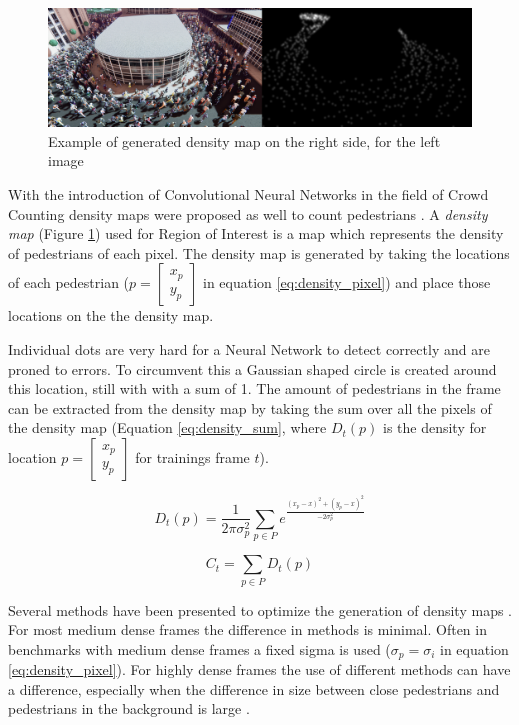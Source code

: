 \begin{figure}[h]
\centering
\includegraphics[width=1.0\textwidth]{images/example_count_map}
\caption{Example of generated density map on the right side, for the left image}
\label{fig:density_map}
\end{figure}

With the introduction of Convolutional Neural Networks in the field of Crowd Counting density maps were proposed as well to count pedestrians \cite{Zhang2016, Liu2019, li2018csrnet}. A \emph{density map} (Figure \ref{fig:density_map}) used for Region of Interest is a map which represents the density of pedestrians of each pixel. The density map is generated by taking the locations of each pedestrian ($p=\begin{bmatrix} x_p \\ y_p \end{bmatrix}$ in equation \ref{eq:density_pixel}) and place those locations on the the density map.

Individual dots are very hard for a Neural Network to detect correctly and are proned to errors. To circumvent this a Gaussian shaped circle is created around this location, still with with a sum of 1. The amount of pedestrians in the frame can be extracted from the density map by taking the sum over all the pixels of the density map (Equation \ref{eq:density_sum}, where $D_t(p)$ is the density for location $p=\begin{bmatrix} x_p \\ y_p \end{bmatrix}$ for trainings frame $t$).

\begin{equation}
\label{eq:density_pixel}
	D_t(p) = \frac{1}{2 \pi \sigma_p^2}\sum_{p\in P} e^{\frac{(x_p-x)^2+(y_p-x)^2}{-2 \sigma_p^2}}
\end{equation}

\begin{equation}
	\label{eq:density_sum}
	C_t = \sum_{p\in P} D_t(p)
\end{equation}

Several methods have been presented to optimize the generation of density maps \cite{Zhang2016, li2018csrnet, Wan2019}. For most medium dense frames the difference in methods is minimal. Often in benchmarks with medium dense frames a fixed sigma is used ($\sigma_p=\sigma_i$ in equation \ref{eq:density_pixel}). For highly dense frames the use of different methods can have a difference, especially when the difference in size between close pedestrians and pedestrians in the background is large \cite{li2018csrnet}.

